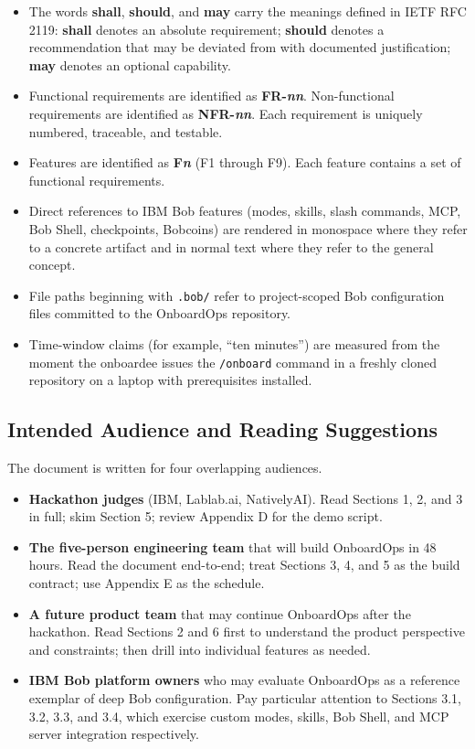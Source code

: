 \documentclass[11pt,letterpaper]{article}
\newcommand{\shall}{\textbf{shall}}
\newcommand{\should}{\textbf{should}}
\newcommand{\may}{\textbf{may}}
\begin{document}
\begin{itemize}
  \item The words \shall, \should, and \may{} carry the meanings defined in IETF RFC 2119: \shall{} denotes an absolute requirement; \should{} denotes a recommendation that may be deviated from with documented justification; \may{} denotes an optional capability.
  \item Functional requirements are identified as \textbf{FR-\textit{nn}}. Non-functional requirements are identified as \textbf{NFR-\textit{nn}}. Each requirement is uniquely numbered, traceable, and testable.
  \item Features are identified as \textbf{F\textit{n}} (F1 through F9). Each feature contains a set of functional requirements.
  \item Direct references to IBM Bob features (modes, skills, slash commands, MCP, Bob Shell, checkpoints, Bobcoins) are rendered in monospace where they refer to a concrete artifact and in normal text where they refer to the general concept.
  \item File paths beginning with \texttt{.bob/} refer to project-scoped Bob configuration files committed to the OnboardOps repository.
  \item Time-window claims (for example, ``ten minutes'') are measured from the moment the onboardee issues the \texttt{/onboard} command in a freshly cloned repository on a laptop with prerequisites installed.
\end{itemize}

\subsection{Intended Audience and Reading Suggestions}

The document is written for four overlapping audiences.

\begin{itemize}
  \item \textbf{Hackathon judges} (IBM, Lablab.ai, NativelyAI). Read Sections 1, 2, and 3 in full; skim Section 5; review Appendix D for the demo script.
  \item \textbf{The five-person engineering team} that will build OnboardOps in 48 hours. Read the document end-to-end; treat Sections 3, 4, and 5 as the build contract; use Appendix E as the schedule.
  \item \textbf{A future product team} that may continue OnboardOps after the hackathon. Read Sections 2 and 6 first to understand the product perspective and constraints; then drill into individual features as needed.
  \item \textbf{IBM Bob platform owners} who may evaluate OnboardOps as a reference exemplar of deep Bob configuration. Pay particular attention to Sections 3.1, 3.2, 3.3, and 3.4, which exercise custom modes, skills, Bob Shell, and MCP server integration respectively.
\end{itemize}
\end{document}
